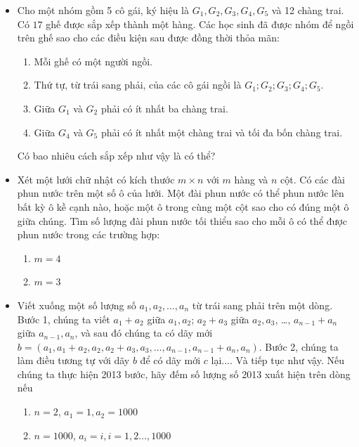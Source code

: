 \documentclass[11pt]{scrartcl}
\begin{document}
\begin{itemize}[label=, leftmargin=0em, itemsep=0.5em]
    \item \begin{btvn}
        Cho một nhóm gồm 5 cô gái, ký hiệu là $G_1,G_2,G_3,G_4,G_5$ và 12 chàng trai. Có $17$ ghế được sắp xếp thành một hàng. Các học sinh đã được nhóm để ngồi trên ghế sao cho các điều kiện sau được đồng thời thỏa mãn:
        \begin{enumerate}[label=(\alph*)]
            \item Mỗi ghế có một người ngồi.
            \item Thứ tự, từ trái sang phải, của các cô gái ngồi là $G_1; G_2; G_3; G_4; G_5.$
            \item Giữa $G_1$ và $G_2$ phải có ít nhất ba chàng trai.
            \item Giữa $G_4$ và $G_5$ phải có ít nhất một chàng trai và tối đa bốn chàng trai.
            
        \end{enumerate} 
    Có bao nhiêu cách sắp xếp như vậy là có thể?
    \end{btvn}

    \item \begin{btvn}
    Xét một lưới chữ nhật có kích thước $m\times n$ với $m$ hàng và $n$ cột. Có các đài phun nước trên một số ô của lưới. Một đài phun nước có thể phun nước lên bất kỳ ô kề cạnh nào, hoặc một ô trong cùng một cột sao cho có đúng một ô giữa chúng. Tìm số lượng đài phun nước tối thiểu sao cho mỗi ô có thể được phun nước trong các trường hợp:
    \begin{enumerate}[label=(\alph*)]
        \item $m=4$
        \item $m=3$
    \end{enumerate}
    \end{btvn}

    \item \begin{btvn}
        Viết xuống một số lượng số $a_1, a_2, \ldots, a_n$ từ trái sang phải trên một dòng. Bước 1, chúng ta viết $a_1+a_2$ giữa $a_1,a_2$; $a_2+a_3$ giữa $a_2,a_3$, …, $a_{n-1}+a_n$ giữa $a_{n-1},a_n$, và sau đó chúng ta có dãy mới $b=(a_1, a_1+a_2,a_2,a_2+a_3,a_3, \ldots, a_{n-1}, a_{n-1}+a_n, a_n)$. Bước 2, chúng ta làm điều tương tự với dãy $b$ để có dãy mới $c$ lại.... Và tiếp tục như vậy. Nếu chúng ta thực hiện 2013 bước, hãy đếm số lượng số 2013 xuất hiện trên dòng nếu
        \begin{enumerate}[label=(\alph*)]
            \item $n=2$, $a_1=1, a_2=1000$
            \item $n=1000$, $a_i=i, i=1,2\ldots, 1000$
        \end{enumerate}
    \end{btvn}


\end{itemize}
\end{document}
